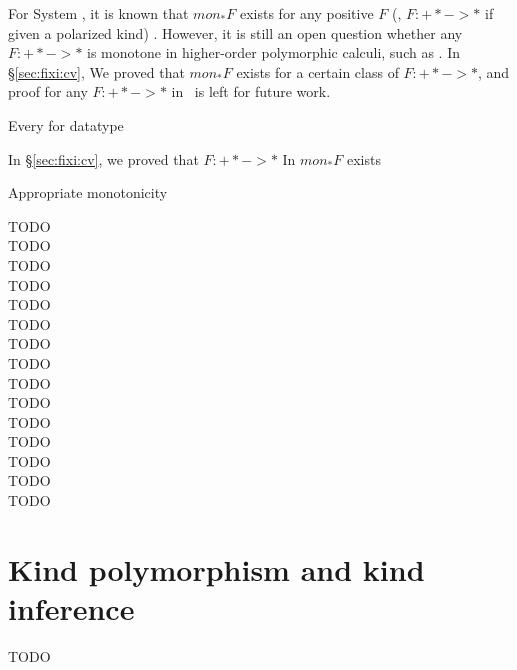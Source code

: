 For System \F, it is known that $mon_{*}F$ exists for any positive $F$
(\ie, $F:+* -> *$ if given a polarized kind) \cite{Mat99}. However,
it is still an open question whether any $F:+* -> *$ is monotone
in higher-order polymorphic calculi, such as \Fixi. In \S\ref{sec:fixi:cv},
We proved that $mon_{*}F$ exists for a certain class of $F:+* -> *$,
and proof for any $F:+* -> *$ in \Fixi\ is left for future work.

Every for datatype

In \S\ref{sec:fixi:cv},
we proved that $F:+* -> *$
In $mon_{*}F$ exists

Appropriate monotonicity

TODO \\ 
TODO \\ 
TODO \\ 
TODO \\ 
TODO \\ 
TODO \\ 
TODO \\ 
TODO \\ 
TODO \\ 
TODO \\ 
TODO \\ 
TODO \\ 
TODO \\ 
TODO \\ 
TODO \\ 


\section{Kind polymorphism and kind inference}\label{sec:futwork:kindpoly}
TODO


